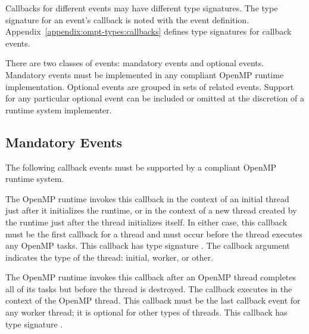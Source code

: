 \documentclass{article}
\newcommand{\descheader}[1]{{\needspace{3\baselineskip}\vspace{1em}\noindent \fbox{#1}}}
\begin{document}
Callbacks for different events may have different type signatures. 
The type signature for an event's callback is noted with the event definition.  Appendix~\ref{appendix:ompt-types:callbacks} defines type signatures for callback events.


There are two classes of events: mandatory events and optional events.
Mandatory events must be implemented in any compliant OpenMP runtime implementation. 
Optional events are grouped in sets of related events. Support for any particular optional event can be included or omitted at the 
discretion of a runtime system implementer. 




\subsection{Mandatory Events}
\label{sec:mandatory-events}

 The following callback events must be supported by a compliant OpenMP 
 runtime system. 

\descheader{Threads}

\begin{description}

\item {}

The OpenMP runtime invokes this callback in the context of an initial thread just after it initializes the runtime, or in the context of a new thread created by the runtime just after the thread initializes itself. In either case, this callback must be the first callback for a thread
and must occur before the thread executes any OpenMP tasks. This callback has type signature . 
The callback argument  indicates the type of the thread: initial, worker, or other.


\item {}

The OpenMP runtime invokes this callback
after an OpenMP thread completes all of
its tasks but before the thread is destroyed. The callback
executes in the context of the OpenMP thread. This callback must be the last callback event for any worker thread; it is optional for other types of threads.
This callback has type signature . 

\end{description}

\descheader{Parallel Regions}
\end{document}
